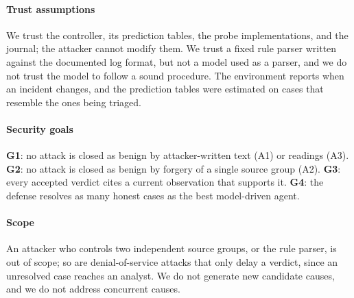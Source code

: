 \paragraph{Trust assumptions} We trust the controller, its prediction tables, the probe implementations, and the journal; the attacker cannot modify them. We trust a fixed rule parser written against the documented log format, but not a model used as a parser, and we do not trust the model to follow a sound procedure. The environment reports when an incident changes, and the prediction tables were estimated on cases that resemble the ones being triaged.

\paragraph{Security goals} \textbf{G1}: no attack is closed as benign by attacker-written text (A1) or readings (A3). \textbf{G2}: no attack is closed as benign by forgery of a single source group (A2). \textbf{G3}: every accepted verdict cites a current observation that supports it. \textbf{G4}: the defense resolves as many honest cases as the best model-driven agent.

\paragraph{Scope} An attacker who controls two independent source groups, or the rule parser, is out of scope; so are denial-of-service attacks that only delay a verdict, since an unresolved case reaches an analyst. We do not generate new candidate causes, and we do not address concurrent causes.
